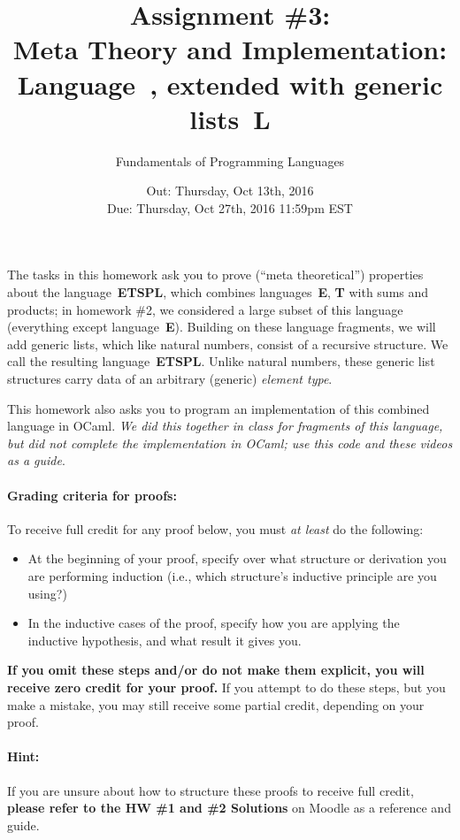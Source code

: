 \documentclass[11pt]{article}
\title{Assignment \#3: \\
  Meta Theory and Implementation:
  \\Language~\ETSP, extended with generic lists~\textbf{\textsf{L}}}
\author{Fundamentals of Programming Languages}
\date{Out: Thursday, Oct 13th, 2016\\
      Due: Thursday, Oct 27th, 2016 11:59pm EST}
\newcommand{\E}{\textbf{\textsf{E}}\xspace}
\newcommand{\T}{\textbf{\textsf{T}}\xspace}
\newcommand{\ETSPL}{\textbf{\textsf{ETSPL}}\xspace}
\begin{document}
\maketitle

The tasks in this homework ask you to prove (``meta theoretical'')
properties about the language~\ETSPL, which combines languages~\E, \T
with sums and products; in homework \#2, we considered a large subset
of this language (everything except language~\E).  Building on these
language fragments, we will add generic lists, which like natural
numbers, consist of a recursive structure.
%
We call the resulting language~\ETSPL.
%
Unlike natural numbers, these generic list structures carry data of an
arbitrary (generic) \emph{element type}.

This homework also asks you to program an implementation of this
combined language in OCaml.
%
\emph{We did this together in class for fragments of this language,
  but did not complete the implementation in OCaml; use this code and
  these videos as a guide}.

\paragraph{Grading criteria for proofs:} 
To receive full credit for any proof below, you must \emph{at least} do the following:
\begin{itemize}
\item At the beginning of your proof, specify over what structure or
  derivation you are performing induction (i.e., which structure's
  inductive principle are you using?)
\item In the inductive cases of the proof, specify how you are applying the inductive hypothesis, and what result it gives you.
\end{itemize}
\textbf{If you omit these steps and/or do not make them explicit, you
  will receive zero credit for your proof.}  If you attempt to do
these steps, but you make a mistake, you may still receive some partial credit, depending on your proof.

\paragraph{Hint:}
If you are unsure about how to structure these proofs to receive full credit, 
\textbf{please refer to the HW \#1 and \#2 Solutions} on Moodle as a reference and guide.
\end{document}
